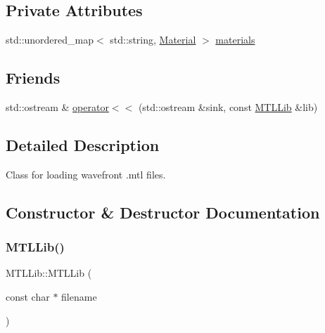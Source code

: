 \subsection*{Private Attributes}
\begin{DoxyCompactItemize}
\item 
std\+::unordered\+\_\+map$<$ std\+::string, \mbox{\hyperlink{classMaterial}{Material}} $>$ \mbox{\hyperlink{classMTLLib_aff9c5fb2df226fe6c383ed8faaf9e49d}{materials}}
\end{DoxyCompactItemize}
\subsection*{Friends}
\begin{DoxyCompactItemize}
\item 
std\+::ostream \& \mbox{\hyperlink{classMTLLib_a8827df67313eff58b309533133a8f437}{operator$<$$<$}} (std\+::ostream \&sink, const \mbox{\hyperlink{classMTLLib}{M\+T\+L\+Lib}} \&lib)
\end{DoxyCompactItemize}


\subsection{Detailed Description}
Class for loading wavefront .mtl files. 

\subsection{Constructor \& Destructor Documentation}
\mbox{\label{classMTLLib_a9d67275ad7ced3768135bd40bc821616}} 
\subsubsection{\texorpdfstring{MTLLib()}{MTLLib()}\hspace{0.1cm}{\footnotesize\ttfamily [1/2]}}
{\footnotesize\ttfamily M\+T\+L\+Lib\+::\+M\+T\+L\+Lib (\begin{DoxyParamCaption}\item[{const char $\ast$}]{filename }\end{DoxyParamCaption})\hspace{0.3cm}{\ttfamily [explicit]}}

\mbox{\label{classMTLLib_a1f6320f63cdc48012b12b993ce74777c}} 
